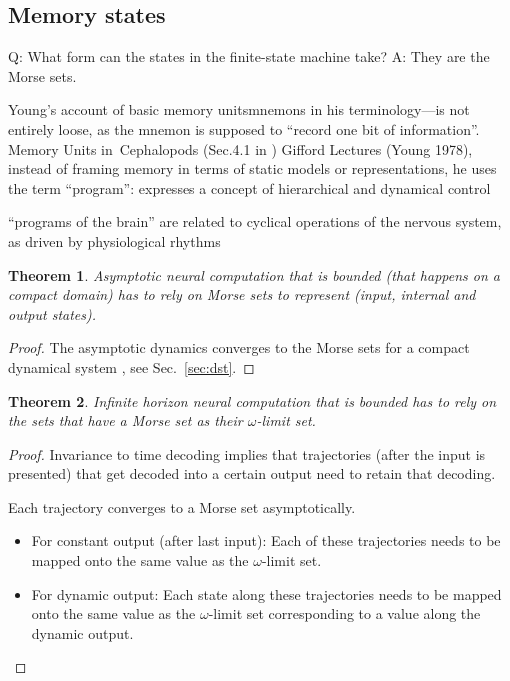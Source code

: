 \documentclass{scrartcl}
\newtheorem{theorem}{Theorem}
\theoremstyle{definition}
\theoremstyle{remark}
\begin{document}
\subsection{Memory states}%
Q: What form can the states in the finite-state machine take?
A: They are the Morse sets.

Young’s account of basic memory unitsmnemons in his terminology—is not entirely loose, as the mnemon is supposed to ``record one bit of information''\citep{young1978}. %
Memory Units in Cephalopods (Sec.4.1 in \citep{milkowski2018})
Gifford Lectures (Young 1978), instead of framing memory in terms of static models or representations, he uses the term ``program'': expresses a concept of hierarchical and dynamical control

``programs of the brain'' are related to cyclical operations of the nervous system, as driven by physiological rhythms


\begin{theorem}
Asymptotic neural computation that is bounded (that happens on a compact domain) has to rely on Morse sets to represent (input, internal and output states).
\end{theorem}

\begin{proof}
The asymptotic dynamics converges to the Morse sets for a compact dynamical system \cite{conley1978}, see Sec.~\ref{sec:dst}.
\end{proof}


\begin{theorem}	
Infinite horizon neural computation that is bounded has to rely on the sets that have a Morse set as their $\omega$-limit set.
\end{theorem}	

\begin{proof}
Invariance to time decoding implies that trajectories (after the input is presented) that get decoded into a certain output need to retain that decoding.

Each trajectory converges to a Morse set asymptotically.

\begin{itemize}
\item For constant output (after last input): Each of these trajectories needs to be mapped onto the same value as the $\omega$-limit set.
\item For dynamic output: Each state along these trajectories needs to be mapped onto the same value as the $\omega$-limit set corresponding to a value along the dynamic output. %
\end{itemize}
\end{proof}
\end{document}
